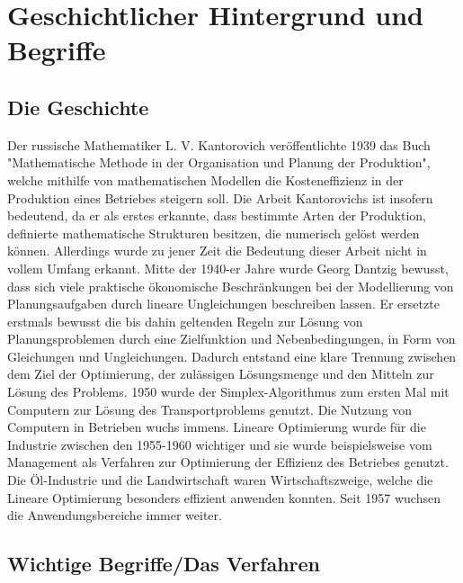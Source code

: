 \section{Geschichtlicher Hintergrund und Begriffe}
\subsection{Die Geschichte}
Der russische Mathematiker L. V. Kantorovich veröffentlichte 1939 das Buch "Mathematische Methode in der Organisation und Planung der Produktion", welche mithilfe von mathematischen Modellen die Kosteneffizienz in der Produktion eines Betriebes steigern soll. Die Arbeit Kantorovichs ist insofern bedeutend, da er als erstes erkannte, dass bestimmte Arten der Produktion, definierte mathematische Strukturen besitzen, die numerisch gelöst werden können. Allerdings wurde zu jener Zeit die Bedeutung dieser Arbeit nicht in vollem Umfang erkannt. Mitte der 1940-er Jahre wurde Georg Dantzig bewusst, dass sich viele praktische ökonomische Beschränkungen bei der Modellierung von Planungsaufgaben durch lineare Ungleichungen beschreiben lassen. Er ersetzte erstmals bewusst die bis dahin geltenden Regeln zur Lösung von Planungsproblemen durch eine Zielfunktion und Nebenbedingungen, in Form von Gleichungen und Ungleichungen. Dadurch entstand eine klare Trennung zwischen dem Ziel der Optimierung, der zulässigen Lösungsmenge und den Mitteln zur Lösung des Problems. 1950 wurde der Simplex-Algorithmus zum ersten Mal mit Computern zur Lösung des Transportproblems genutzt. Die Nutzung von Computern in Betrieben wuchs immens. Lineare Optimierung wurde für die Industrie zwischen den 1955-1960 wichtiger und sie wurde beispielsweise vom Management als Verfahren zur Optimierung der Effizienz des Betriebes genutzt. Die Öl-Industrie und die Landwirtschaft waren Wirtschaftszweige, welche die Lineare Optimierung besonders effizient anwenden konnten. Seit 1957 wuchsen die Anwendungsbereiche immer weiter. 
\\
\subsection{Wichtige Begriffe/Das Verfahren}

